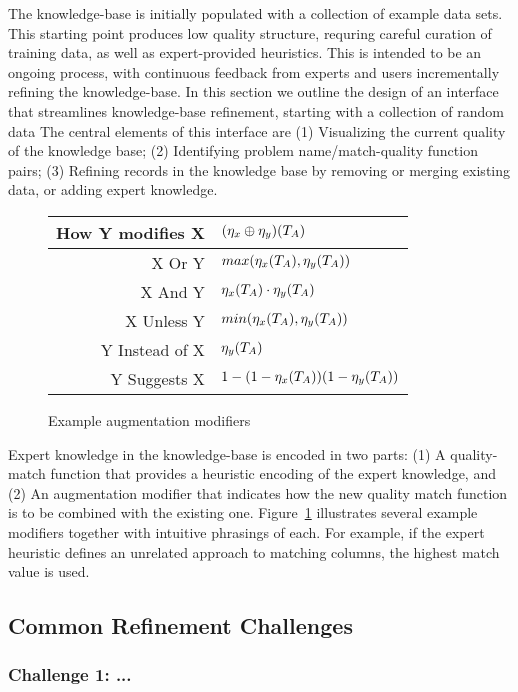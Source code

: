 
The \systemname knowledge-base is initially populated with a collection of example data sets.
This starting point produces low quality structure, requring careful curation of training data, as well as expert-provided heuristics.
This is intended to be an ongoing process, with continuous feedback from experts and users incrementally refining the knowledge-base.
In this section we outline the design of an interface that streamlines knowledge-base refinement, starting with a collection of random data
The central elements of this interface are 
(1) Visualizing the current quality of the knowledge base;
(2) Identifying problem name/match-quality function pairs;
(3) Refining records in the knowledge base by removing or merging existing data, or adding expert knowledge.


\begin{figure}
\begin{tabular}{r|l}
\textbf{How Y modifies X} & $(\eta_x \oplus \eta_y)(T_A)$ \\\hline
X Or Y & $max(\eta_x(T_A), \eta_y(T_A))$\\
X And Y & $\eta_x(T_A) \cdot \eta_y(T_A)$\\
X Unless Y & $min(\eta_x(T_A), \eta_y(T_A))$\\
Y Instead of X & $\eta_y(T_A)$\\
Y Suggests X & $1-(1-\eta_x(T_A))(1-\eta_y(T_A))$
\end{tabular}
\caption{Example augmentation modifiers}
\label{fig:modifiers}
\end{figure}

Expert knowledge in the knowledge-base is encoded in two parts: 
(1) A quality-match function that provides a heuristic encoding of the expert knowledge, and 
(2) An augmentation modifier that indicates how the new quality match function is to be combined with the existing one.  
Figure~\ref{fig:modifiers} illustrates several example modifiers together with intuitive phrasings of each.  
For example, if the expert heuristic defines an unrelated approach to matching columns, the highest match value is used.


\subsection{Common Refinement Challenges}

\subsubsection{Challenge 1: ...}